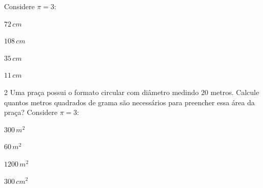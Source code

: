 Considere $π = 3$:

\begin{escolha}
\item $72\,cm$
\item $108\,cm$
\item $35\,cm$
\item $11\,cm$
\end{escolha}



\num{2}  Uma praça possui o formato circular com diâmetro medindo $20$ metros.
Calcule quantos metros quadrados de grama são necessários para preencher
essa área da praça? Considere $π = 3$:

\begin{escolha}
\item $300\,m^2$
\item $60\,m^2$
\item $1200\,m^2$
\item $300\,cm^2$
\end{escolha}


